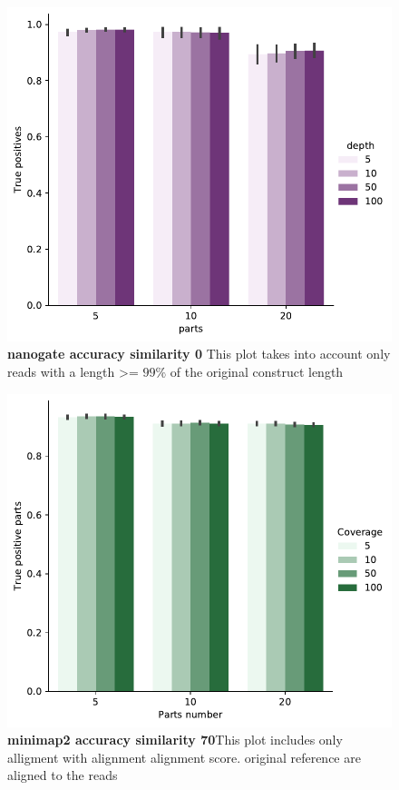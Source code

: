 \documentclass[11pt, a4paper]{article}
\begin{document}
\begin{figure}[ht]
    \begin{center}
    \includegraphics[width=1\textwidth]{../results/images_notebook/v_340/00_nanogate_good_reads_true_positves.pdf}
    \end{center}
    \caption{{\bf nanogate accuracy similarity 0} This plot takes into account only reads with a length >= $99\%$ of the
    original construct length }
   \label{fig:v_340_nanogate_accuracy_sim_0}
\end{figure}


\begin{figure}[ht]
    \begin{center}
    \includegraphics[width=1\textwidth]{../results/images_notebook/v_340/70_minimap2_true_positive.pdf}
    \end{center}
    \caption{{\bf  minimap2 accuracy similarity 70}This plot includes only alligment with alignment alignment score.
    original reference are aligned to the reads }
   \label{fig:v_340_minimap_accuracy_sim_70}
\end{figure}
\end{document}
